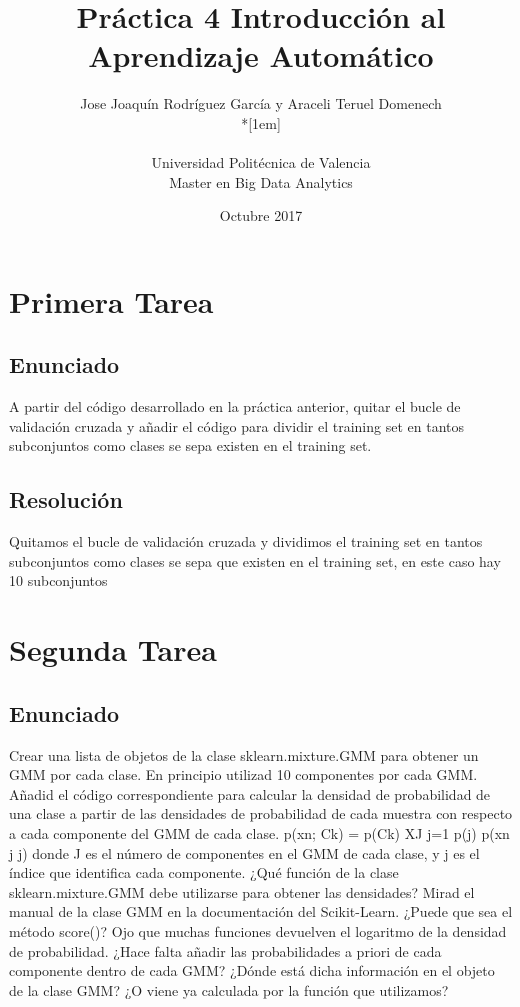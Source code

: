 \documentclass[12pt,twoside]{article}
\title{Práctica 4 Introducción al Aprendizaje Automático}
\author{Jose Joaquín Rodríguez García y Araceli Teruel Domenech\\*[1em]
\begin{minipage}{0.75\textwidth}
\footnotesize \itshape
\begin{center}
Universidad Politécnica de Valencia \\
Master en Big Data Analytics
\end{center}
\end{minipage}
}
\date{Octubre 2017}
\begin{document}
\maketitle


\section{Primera Tarea}

\subsection{Enunciado}

\noindent
A partir del código desarrollado en la práctica anterior, quitar el bucle de validación cruzada y añadir el código para dividir el training set en tantos subconjuntos como clases se sepa existen en el training set.


\subsection{Resolución}
Quitamos el bucle de validación cruzada y dividimos el training set en tantos subconjuntos como clases se sepa que existen en el training set, en este caso hay 10 subconjuntos


\section{Segunda Tarea}

\subsection{Enunciado}

\noindent
Crear una lista de objetos de la clase sklearn.mixture.GMM para obtener un GMM por cada clase. En principio utilizad 10 componentes por cada GMM. Añadid el código correspondiente para calcular la densidad de probabilidad de una clase a partir de las densidades de probabilidad de cada muestra con respecto a cada componente del GMM de cada clase. 
p(xn; Ck) = p(Ck)
XJ
j=1
p(j) p(xn j j)
donde J es el número de componentes en el GMM de cada clase, y j es el índice que identifica cada componente. ¿Qué función de la clase sklearn.mixture.GMM debe utilizarse para obtener las densidades? Mirad el manual de la clase GMM en la documentación del Scikit-Learn. ¿Puede que sea el método score()? Ojo que muchas funciones devuelven el logaritmo de la densidad de probabilidad. ¿Hace falta añadir las probabilidades a priori de cada componente dentro de cada GMM? ¿Dónde está dicha información en el objeto de la clase GMM? ¿O viene ya calculada por la función que utilizamos?
\end{document}
